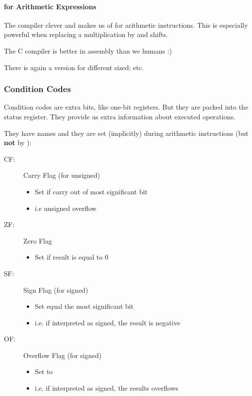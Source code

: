 \paragraph{ for Arithmetic Expressions}
The compiler clever and makes us of  for arithmetic instructions. This is especially powerful when replacing a multiplication by  and shifts.

The C compiler is better in assembly than we humans :)

There is again a version for different sized:  etc.

\subsubsection{Condition Codes}
Condition codes are extra bits, like one-bit registers. But they are packed into the status register. They provide us extra information about executed operations.

They have names and they are set (implicitly) during arithmetic instructions (but \textbf{not} by ):
\begin{description}
    \item[CF:] Carry Flag (for unsigned)
        \begin{itemize}
            \item Set if carry out of most significant bit
            \item i.e unsigned overflow
        \end{itemize}
    \item[ZF:] Zero Flag
        \begin{itemize}
            \item Set if result is equal to $0$
        \end{itemize}
    \item[SF:] Sign Flag (for signed)
        \begin{itemize}
            \item Set equal the most significant bit
            \item i.e. if interpreted as signed, the result is negative
        \end{itemize}
    \item[OF:] Overflow Flag (for signed)
        \begin{itemize}
            \item Set to 
            \item i.e. if interpreted as signed, the results overflows
        \end{itemize}
\end{description}

